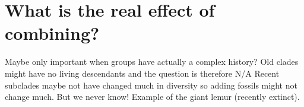 \section{What is the real effect of combining?}
Maybe only important when groups have actually a complex history?
Old clades might have no living descendants and the question is therefore N/A
Recent subclades maybe not have changed much in diversity so adding fossils might not change much.
But we never know! Example of the giant lemur (recently extinct).
